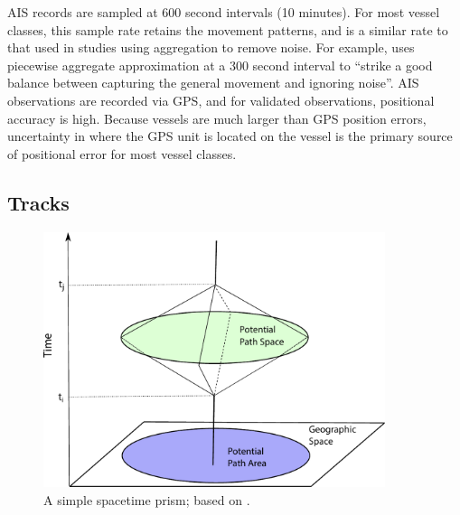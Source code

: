 AIS records are sampled at 600 second intervals (10 minutes). For most vessel classes, this sample rate retains the movement patterns, and is a similar rate to that used in studies using aggregation to remove noise. For example, \cite{Vries2009} uses piecewise aggregate approximation at a 300 second interval to ``strike a good balance between capturing the general movement and ignoring noise''. %
AIS observations are recorded via GPS, and for validated observations, positional accuracy is high. Because vessels are much larger than GPS position errors, uncertainty in where the GPS unit is located on the vessel is the primary source of positional error for most vessel classes.


\subsection{Tracks}

\begin{figure}[h]
  \centering
    \includegraphics[width=100mm]{figures/time-geography-prism.pdf}
  \caption[A simple space{\textendash}time prism]{A simple space{\textendash}time prism; based on \cite{Wu2002}.}
  \label{fig:time-prism}
\end{figure}

